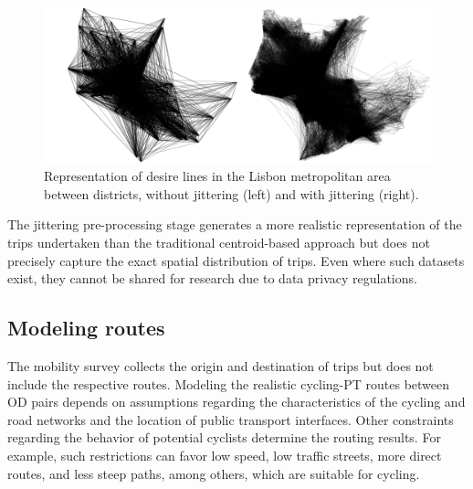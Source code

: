 \documentclass[review, doubleblind, 3p,
authoryear]{elsarticle} %
\begin{document}
\begin{figure}

{\centering \includegraphics[width=1\linewidth,]{img/jitter} 

}

\caption{Representation of desire lines in the Lisbon metropolitan area between districts, without jittering (left) and with jittering (right).}\label{fig:jitter}
\end{figure}

The jittering pre-processing stage generates a more realistic
representation of the trips undertaken than the traditional
centroid-based approach but does not precisely capture the exact spatial
distribution of trips. Even where such datasets exist, they cannot be
shared for research due to data privacy regulations.

\hypertarget{modeling-routes}{%
\subsection{Modeling routes}\label{modeling-routes}}

The mobility survey collects the origin and destination of trips but
does not include the respective routes. Modeling the realistic
cycling-PT routes between OD pairs depends on assumptions regarding the
characteristics of the cycling and road networks and the location of
public transport interfaces. Other constraints regarding the behavior of
potential cyclists determine the routing results. For example, such
restrictions can favor low speed, low traffic streets, more direct
routes, and less steep paths, among others, which are suitable for
cycling.
\end{document}
